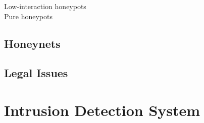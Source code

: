 Low-interaction honeypots\\

Pure honeypots\\



\subsection{Honeynets}

\cite{Spitzner2003}

\subsection{Legal Issues}

\cite{Spitzner2003}

\section{Intrusion Detection System}
